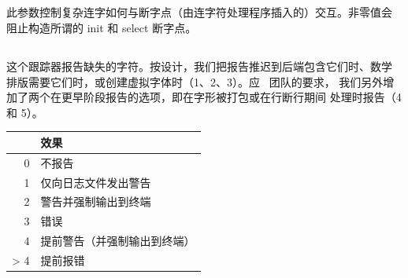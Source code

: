 \subsection{\type {\discretionaryligaturemode}}

此参数控制复杂连字如何与断字点（由连字符处理程序插入的）交互。非零值会
阻止构造所谓的 init 和 select 断字点。


\subsection{\type{\tracinglostchars}}

这个跟踪器报告缺失的字符。按设计，我们把报告推迟到后端包含它们时、数学
排版需要它们时，或创建虚拟字体时（1、2、3）。应 \LATEX\ 团队的要求，
我们另外增加了两个在更早阶段报告的选项，即在字形被打包或在行断行期间
处理时报告（4 和 5）。

\begin{longtable}{r l}
    \toprule     & 效果 \\
    \midrule
0   & 不报告 \\
1   & 仅向日志文件发出警告 \\
2   & 警告并强制输出到终端 \\
3   & 错误 \\
4   & 提前警告（并强制输出到终端） \\
> 4 & 提前报错 \\
    \bottomrule
\end{longtable}
